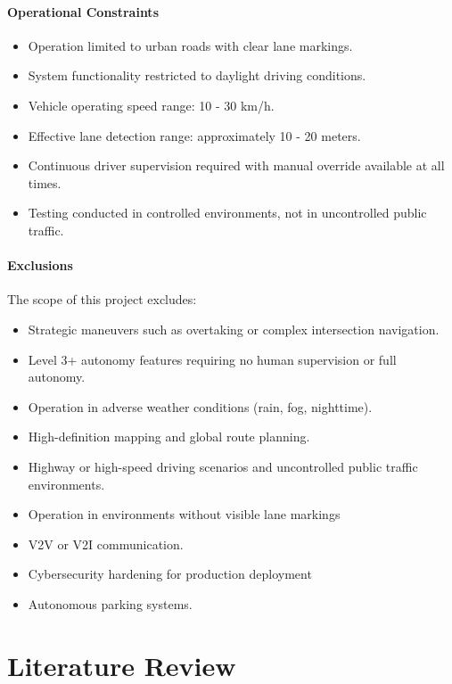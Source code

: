 \documentclass[12pt, a4paper]{report}
\begin{document}
\subsubsection{Operational Constraints}

\begin{itemize}
    \item Operation limited to urban roads with clear lane markings.
    \item System functionality restricted to daylight driving conditions.
    \item Vehicle operating speed range: 10 - 30 km/h.
    \item Effective lane detection range: approximately 10 - 20 meters.
    \item Continuous driver supervision required with manual override available at all times.
    \item Testing conducted in controlled environments, not in uncontrolled public traffic.
\end{itemize}

\subsubsection{Exclusions}

The scope of this project excludes:

\begin{itemize}
    \item Strategic maneuvers such as overtaking or complex intersection navigation.
    \item Level 3+ autonomy features requiring no human supervision or full autonomy.
    \item Operation in adverse weather conditions (rain, fog, nighttime).
    \item High-definition mapping and global route planning.
    \item Highway or high-speed driving scenarios and uncontrolled public traffic environments.
    \item Operation in environments without visible lane markings
    \item \ac{V2V} or \ac{V2I} communication.
    \item Cybersecurity hardening for production deployment
    \item Autonomous parking systems.
\end{itemize}

\chapter{Literature Review}
\end{document}
